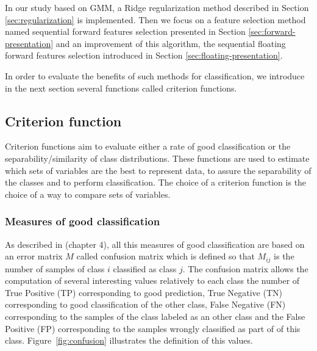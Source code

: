 \documentclass[a4paper,11pt,DIV=16,abstracton]{scrartcl}
\begin{document}
    In our study based on GMM, a Ridge regularization method described in Section \ref{sec:regularization} is implemented. Then we focus on a feature selection method named sequential forward features selection presented in Section \ref{sec:forward-presentation} and an improvement of this algorithm, the sequential floating forward features selection introduced in Section \ref{sec:floating-presentation}.

    In order to evaluate the benefits of such methods for classification, we introduce in the next section several functions called criterion functions.

    \subsection{Criterion function}
    \label{sec:criterion}

    Criterion functions aim to evaluate either a rate of good classification or the separability/similarity of class distributions. These functions are used to estimate which sets of variables are the best to represent data, to assure the separability of the classes and to perform classification. The choice of a criterion function is the choice of a way to compare sets of variables.

        \subsubsection{Measures of good classification}
        \label{sec:criterion-rate}

        As described in \cite{congalton2008assessing} (chapter 4), all this measures of good classification are based on an error matrix $M$ called confusion matrix which is defined so that $M_{ij}$ is the number of samples of class $i$ classified as class $j$. The confusion matrix allows the computation of several interesting values relatively to each class the number of True Positive (TP) corresponding to good prediction, True Negative (TN) corresponding to good classification of the other class, False Negative (FN) corresponding to the samples of the class labeled as an other class and the False Positive (FP) corresponding to the samples wrongly classified as part of of this class. Figure~\ref{fig:confusion} illustrates the definition of this values.
\end{document}
